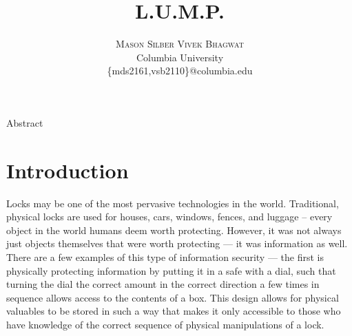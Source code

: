\documentclass[twoside]{article}
\title{\vspace{-15mm}\fontsize{24pt}{10pt}\selectfont\textbf{L.U.M.P.}} %
\author{
    \large
    \textsc{Mason Silber \quad Vivek Bhagwat}\\[2mm] %
    \normalsize Columbia University \\ %
    \normalsize \{mds2161,vsb2110\}@columbia.edu %
    \vspace{-5mm}
}
\date{}
\begin{document}
\maketitle %



\begin{multicols}{2} %


\begin{abstract}

\noindent \lipsum[1] %

\end{abstract}
Abstract

\section{Introduction}
Locks may be one of the most pervasive technologies in the world. Traditional, physical locks are used for houses, cars, windows, fences, and luggage – every object in the world humans deem worth protecting. However, it was not always just objects themselves that were worth protecting --- it was information as well.\\

There are a few examples of this type of information security --- the first is physically protecting information by putting it in a safe with a dial, such that turning the dial the correct amount in the correct direction a few times in sequence allows access to the contents of a box. This design allows for physical valuables to be stored in such a way that makes it only accessible to those who have knowledge of the correct sequence of physical manipulations of a lock. \\


\end{multicols}
\end{document}
